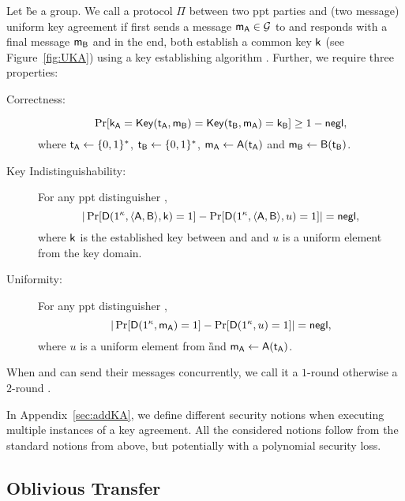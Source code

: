 \begin{definition} 
Let \G be a group.
We call a protocol $\Pi$ between two ppt parties \A and \B (two message) uniform key agreement if \A first sends a message $\mathsf{m}_\mathsf{A}\in\mathcal{G}$ to \B and \B responds with a final message $\mathsf{m}_\mathsf{B}$ and in the end, both establish a common key $\mathsf{k}$ (see Figure~\ref{fig:UKA}) using a key establishing algorithm \EK. Further, we require three properties:
\begin{description}
\item[Correctness:]
$$
\Pr[\mathsf{k}_\mathsf{A}=\mathsf{Key}(\mathsf{t}_\mathsf{A},\mathsf{m}_\mathsf{B})=\mathsf{Key}(\mathsf{t}_\mathsf{B},\mathsf{m}_\mathsf{A})=\mathsf{k}_\mathsf{B}]\geq 1-\mathsf{negl},
$$
where $\mathsf{t}_\mathsf{A}\leftarrow\{0,1\}^*$, $\mathsf{t}_\mathsf{B}\leftarrow\{0,1\}^*$, $\mathsf{m}_\mathsf{A}\leftarrow\mathsf{A}(\mathsf{t}_\mathsf{A})$ and $\mathsf{m}_\mathsf{B}\leftarrow\mathsf{B}(\mathsf{t}_\mathsf{B})$.
\item [Key Indistinguishability:] For any ppt distinguisher \D,
$$ 
|\Pr[\mathsf D(1^\kappa,\langle \mathsf{A},\mathsf{B}\rangle, \mathsf{k})=1]-\Pr[\mathsf D(1^\kappa,\langle \mathsf{A},\mathsf{B}\rangle, u)=1]|=\mathsf{negl},
$$
where $\mathsf{k}$ is the established key between \A and \B and $u$ is a uniform element from the key domain.
\item [Uniformity:] For any ppt distinguisher \D, 
$$
|\Pr[\mathsf D(1^\kappa,\mathsf{m}_\mathsf{A})=1]-\Pr[\mathsf D( 1^\kappa,u)=1]|=\mathsf{negl},
$$
where $u$ is a uniform element from \G and $\mathsf{m}_\mathsf{A}\leftarrow\mathsf{A}(\mathsf{t}_\mathsf{A})$.
\end{description}
When \A and \B can send their messages concurrently, we call it a $1$-round \UKA otherwise a $2$-round \UKA.
\end{definition}

In Appendix~\ref{sec:addKA}, we define different security notions when executing multiple instances of a key agreement. All the considered notions follow from the standard notions from above, but potentially with a polynomial security loss. 


\subsection{Oblivious Transfer}




